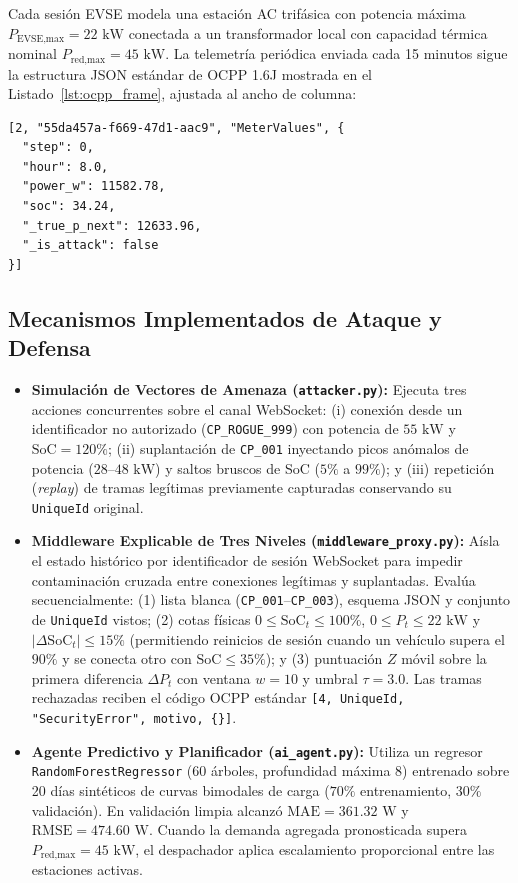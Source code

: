 \documentclass[conference]{IEEEtran}
\begin{document}
Cada sesión EVSE modela una estación AC trifásica con potencia máxima $P_{\text{EVSE,max}} = 22\text{ kW}$ conectada a un transformador local con capacidad térmica nominal $P_{\text{red,max}} = 45\text{ kW}$. La telemetría periódica enviada cada 15 minutos sigue la estructura JSON estándar de OCPP 1.6J mostrada en el Listado~\ref{lst:ocpp_frame}, ajustada al ancho de columna:

\begin{lstlisting}[caption={Estructura de trama OCPP 1.6J \texttt{MeterValues} transmitida sobre WebSocket.},label={lst:ocpp_frame}]
[2, "55da457a-f669-47d1-aac9", "MeterValues", {
  "step": 0,
  "hour": 8.0,
  "power_w": 11582.78,
  "soc": 34.24,
  "_true_p_next": 12633.96,
  "_is_attack": false
}]
\end{lstlisting}

\subsection{Mecanismos Implementados de Ataque y Defensa}

\begin{itemize}
    \item \textbf{Simulación de Vectores de Amenaza (\texttt{attacker.py}):} Ejecuta tres acciones concurrentes sobre el canal WebSocket: (i) conexión desde un identificador no autorizado (\texttt{CP\_ROGUE\_999}) con potencia de $55\text{ kW}$ y $\text{SoC}=120\%$; (ii) suplantación de \texttt{CP\_001} inyectando picos anómalos de potencia ($28$--$48\text{ kW}$) y saltos bruscos de SoC ($5\%$ a $99\%$); y (iii) repetición (\textit{replay}) de tramas legítimas previamente capturadas conservando su \texttt{UniqueId} original.
    \item \textbf{Middleware Explicable de Tres Niveles (\texttt{middleware\_proxy.py}):} Aísla el estado histórico por identificador de sesión WebSocket para impedir contaminación cruzada entre conexiones legítimas y suplantadas. Evalúa secuencialmente: (1) lista blanca (\texttt{CP\_001}--\texttt{CP\_003}), esquema JSON y conjunto de \texttt{UniqueId} vistos; (2) cotas físicas $0 \le \text{SoC}_t \le 100\%$, $0 \le P_t \le 22\text{ kW}$ y $|\Delta\text{SoC}_t| \le 15\%$ (permitiendo reinicios de sesión cuando un vehículo supera el $90\%$ y se conecta otro con $\text{SoC} \le 35\%$); y (3) puntuación $Z$ móvil sobre la primera diferencia $\Delta P_t$ con ventana $w=10$ y umbral $\tau = 3.0$. Las tramas rechazadas reciben el código OCPP estándar \texttt{[4, UniqueId, "SecurityError", motivo, \{\}]}.
    \item \textbf{Agente Predictivo y Planificador (\texttt{ai\_agent.py}):} Utiliza un regresor \texttt{RandomForestRegressor} (60 árboles, profundidad máxima 8) entrenado sobre 20 días sintéticos de curvas bimodales de carga ($70\%$ entrenamiento, $30\%$ validación). En validación limpia alcanzó $\text{MAE} = 361.32\text{ W}$ y $\text{RMSE} = 474.60\text{ W}$. Cuando la demanda agregada pronosticada supera $P_{\text{red,max}} = 45\text{ kW}$, el despachador aplica escalamiento proporcional entre las estaciones activas.
\end{itemize}
\end{document}
